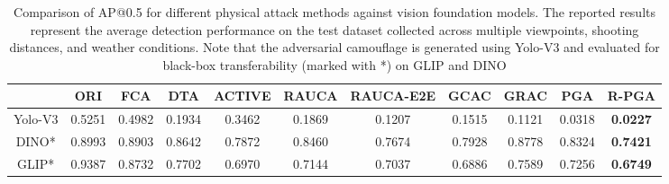 \begin{table}[]
\caption{Comparison of AP@0.5 for different physical attack methods against vision foundation models. The reported results represent the average detection performance on the test dataset collected across multiple viewpoints, shooting distances, and weather conditions. Note that the adversarial camouflage is generated using Yolo-V3 and evaluated for black-box transferability (marked with *) on GLIP and DINO}
\centering
{}

\vspace{2mm}
\begin{tabular}{@{}c|cccccccccc@{}}
\toprule
                             & ORI    & FCA    & DTA    & ACTIVE & RAUCA  & RAUCA-E2E & GCAC   & GRAC   & PGA    & R-PGA           \\ \midrule
\multicolumn{1}{l|}{Yolo-V3} & 0.5251 & 0.4982 & 0.1934 & 0.3462 & 0.1869 & 0.1207    & 0.1515 & 0.1121 & 0.0318 & \textbf{0.0227} \\
DINO*                         & 0.8993 & 0.8903 & 0.8642 & 0.7872 & 0.8460 & 0.7674    & 0.7928 & 0.8778 & 0.8324 & \textbf{0.7421} \\
GLIP*                         & 0.9387 & 0.8732 & 0.7702 & 0.6970 & 0.7144 & 0.7037    & 0.6886 & 0.7589 & 0.7256 & \textbf{0.6749} \\ \bottomrule
\end{tabular}

\label{tab:foundation}
\end{table}